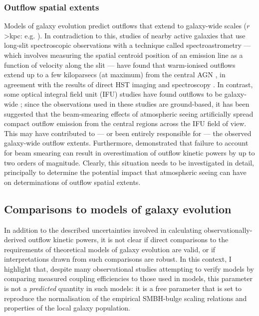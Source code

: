 \subsubsection{Outflow spatial extents}
\label{section: introduction: outflows: kinematics_and_geometry: spatial_extents}

Models of galaxy evolution predict outflows that extend to galaxy-wide scales ($r$\;\textgreater{}\;kpc: e.g. \citealt{Silk1998, DiMatteo2005, King2010, Curtis2016, Costa2018}). In contradiction to this, studies of nearby active galaxies that use long-slit spectroscopic observations with a technique called spectroastrometry --- which involves measuring the spatial centroid position of an emission line as a function of velocity along the slit \citep{Bailey1998} --- have found that warm-ionised outflows extend up to a few kiloparsecs (at maximum) from the central AGN \citep{Carniani2015, Spence2016, VillarMartin2016, Santoro2018, Santoro2020}, in agreement with the results of direct HST imaging \citep{Fischer2018, Tadhunter2018} and spectroscopy \citep{Das2005, Das2006, Das2007, Tadhunter2019}. In contrast, some optical integral field unit (IFU) studies have found outflows to be galaxy-wide \citep{Fu2009, Westmoquette2012, Liu2013, Harrison2014, Wylezalek2017}; since the observations used in these studies are ground-based, it has been suggested that the beam-smearing effects of atmospheric seeing artificially spread compact outflow emission from the central regions across the IFU field of view. This may have contributed to --- or been entirely responsible for --- the observed galaxy-wide outflow extents. Furthermore, \citet{Husemann2016} demonstrated that failure to account for beam smearing can result in overestimation of outflow kinetic powers by up to two orders of magnitude. Clearly, this situation needs to be investigated in detail, principally to determine the potential impact that atmospheric seeing can have on determinations of outflow spatial extents.

\subsection{Comparisons to models of galaxy evolution}
\label{section: introduction: outflows: comparisons_to_models}

In addition to the described uncertainties involved in calculating observationally-derived outflow kinetic powers, it is not clear if direct comparisons to the requirements of theoretical models of galaxy evolution are valid, or if interpretations drawn from such comparisons are robust. In this context, I highlight that, despite many observational studies attempting to verify models by comparing measured coupling efficiencies to those used in models, this parameter is not a \textit{predicted} quantity in such models: it is a free parameter that is set to reproduce the normalisation of the empirical SMBH-bulge scaling relations and properties of the local galaxy population.

